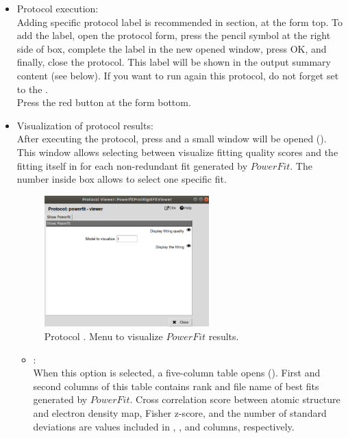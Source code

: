 \begin{itemize}
  \item Protocol execution:\\
  
  Adding specific protocol label is recommended in  section, at the form top. To add the label, open the protocol form, press the pencil symbol at the right side of  box, complete the label in the new opened window, press OK, and finally, close the protocol. This label will be shown in the output summary content (see below). If you want to run again this protocol, do not forget set to  the .\\
  Press the  red button at the form bottom.\\
  
  \item Visualization of protocol results:\\
  
  After executing the protocol, press  and a small window will be opened (). This window allows selecting between visualize fitting quality scores and the fitting itself in \chimera for each non-redundant fit generated by $PowerFit$. The number inside  box allows to select one specific fit.
  
  \begin{figure}[H]
    \centering 
    \captionsetup{width=.7\linewidth} 
    \includegraphics[width=0.60\textwidth]{Images_appendix/Fig114.pdf}
    \caption{Protocol . Menu to visualize $PowerFit$ results.}
    \label{fig:app_protocol_powerfit_2}
   \end{figure}
   
   \begin{itemize}
   
    \item {}:\\ When this option is selected, a five-column table opens (). First and second columns of this table contains rank and file name of best fits generated by $PowerFit$. Cross correlation score between atomic structure and electron density map, Fisher z-score, and the number of standard deviations are values included in , , and  columns, respectively.\\
   

\end{itemize}
\end{itemize}

